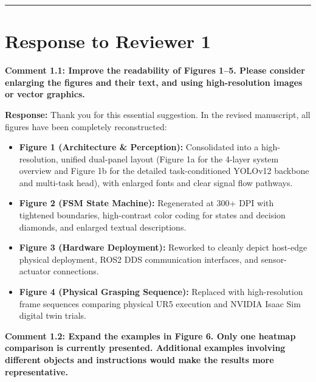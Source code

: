 \documentclass[11pt]{article}
\newcommand{\reviewercomment}[1]{\vspace{1.8ex}\noindent\textbf{\textcolor{revcolor}{#1}}}
\newcommand{\response}{\vspace{1ex}\noindent\textbf{Response: }}
\begin{document}
\vspace{3ex}
\hrule
\vspace{2ex}

\section*{Response to Reviewer 1}

\reviewercomment{Comment 1.1: Improve the readability of Figures 1--5. Please consider enlarging the figures and their text, and using high-resolution images or vector graphics.}

\response
Thank you for this essential suggestion. In the revised manuscript, all figures have been completely reconstructed:
\begin{itemize}[leftmargin=*]
    \item \textbf{Figure 1 (Architecture \& Perception):} Consolidated into a high-resolution, unified dual-panel layout (Figure 1a for the 4-layer system overview and Figure 1b for the detailed task-conditioned YOLOv12 backbone and multi-task head), with enlarged fonts and clear signal flow pathways.
    \item \textbf{Figure 2 (FSM State Machine):} Regenerated at 300+ DPI with tightened boundaries, high-contrast color coding for states and decision diamonds, and enlarged textual descriptions.
    \item \textbf{Figure 3 (Hardware Deployment):} Reworked to cleanly depict host-edge physical deployment, ROS2 DDS communication interfaces, and sensor-actuator connections.
    \item \textbf{Figure 4 (Physical Grasping Sequence):} Replaced with high-resolution frame sequences comparing physical UR5 execution and NVIDIA Isaac Sim digital twin trials.
\end{itemize}

\reviewercomment{Comment 1.2: Expand the examples in Figure 6. Only one heatmap comparison is currently presented. Additional examples involving different objects and instructions would make the results more representative.}
\end{document}
